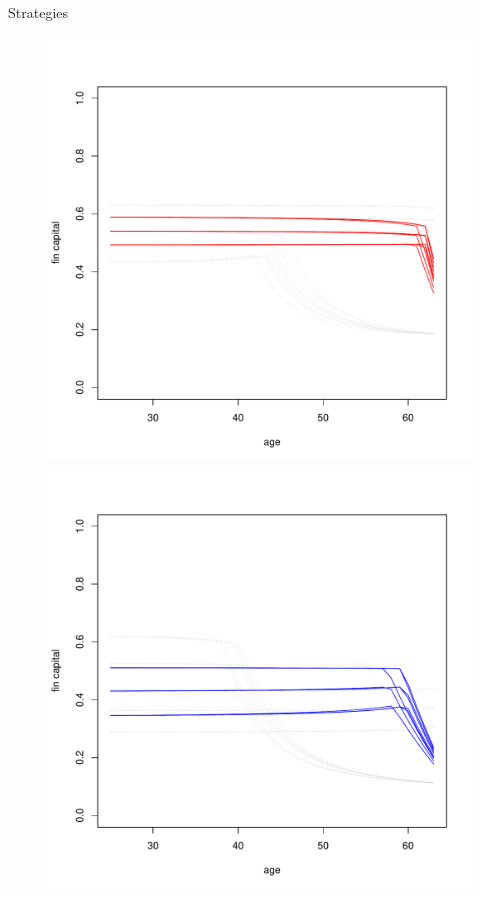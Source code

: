 \documentclass{beamer}
\begin{document}
\begin{frame}[allowframebreaks]{Strategies}
\begin{itemize}
\begin{figure}[H]
		\includegraphics[scale=0.25]{figs/hmunkhouse3.pdf}
		\includegraphics[scale=0.25]{figs/smunkhouse5.pdf}

\end{figure}
\end{itemize}
\end{frame}
\end{document}
